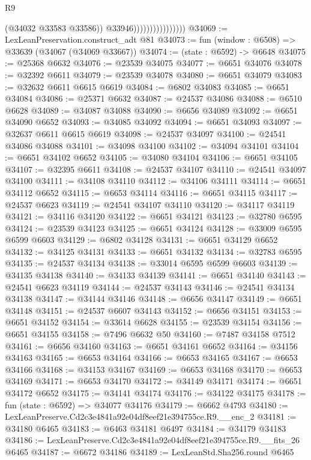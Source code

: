 \begin{lexlean}{R9}
\begin{coremodule}
                                      (@34032 @33583 @33586))
                                    @33946))))))))))))))))
@34069 := LexLeanPreservation.construct_adt @81
@34073 := fun (window : @6508) => @33639 (@34067 (@34069 @33667))
@34074 := (state : @6592) -> @6648
@34075 := @25368 @6632
@34076 := @23539 @34075
@34077 := @6651 @34076
@34078 := @32392 @6611
@34079 := @23539 @34078
@34080 := @6651 @34079
@34083 := @32632 @6611 @6615 @6619
@34084 := @6802 @34083
@34085 := @6651 @34084
@34086 := @25371 @6632
@34087 := @24537 @34086
@34088 := @6510 @6628
@34089 := @34087 @34088
@34090 := @6656 @34089
@34092 := @6651 @34090 @6652
@34093 := @34085 @34092
@34094 := @6651 @34093
@34097 := @32637 @6611 @6615 @6619
@34098 := @24537 @34097
@34100 := @24541 @34086 @34088
@34101 := @34098 @34100
@34102 := @34094 @34101
@34104 := @6651 @34102 @6652
@34105 := @34080 @34104
@34106 := @6651 @34105
@34107 := @32395 @6611
@34108 := @24537 @34107
@34110 := @24541 @34097 @34100
@34111 := @34108 @34110
@34112 := @34106 @34111
@34114 := @6651 @34112 @6652
@34115 := @6653 @34114
@34116 := @6651 @34115
@34117 := @24537 @6623
@34119 := @24541 @34107 @34110
@34120 := @34117 @34119
@34121 := @34116 @34120
@34122 := @6651 @34121
@34123 := @32780 @6595
@34124 := @23539 @34123
@34125 := @6651 @34124
@34128 := @33009 @6595 @6599 @6603
@34129 := @6802 @34128
@34131 := @6651 @34129 @6652
@34132 := @34125 @34131
@34133 := @6651 @34132
@34134 := @32783 @6595
@34135 := @24537 @34134
@34138 := @33014 @6595 @6599 @6603
@34139 := @34135 @34138
@34140 := @34133 @34139
@34141 := @6651 @34140
@34143 := @24541 @6623 @34119
@34144 := @24537 @34143
@34146 := @24541 @34134 @34138
@34147 := @34144 @34146
@34148 := @6656 @34147
@34149 := @6651 @34148
@34151 := @24537 @6607 @34143
@34152 := @6656 @34151
@34153 := @6651 @34152
@34154 := @33614 @6628
@34155 := @23539 @34154
@34156 := @6651 @34155
@34158 := @7496 @6632 @50
@34160 := @7487 @34158 @7512
@34161 := @6656 @34160
@34163 := @6651 @34161 @6652
@34164 := @34156 @34163
@34165 := @6653 @34164
@34166 := @6653 @34165
@34167 := @6653 @34166
@34168 := @34153 @34167
@34169 := @6653 @34168
@34170 := @6653 @34169
@34171 := @6653 @34170
@34172 := @34149 @34171
@34174 := @6651 @34172 @6652
@34175 := @34141 @34174
@34176 := @34122 @34175
@34178 := fun (state : @6592) => @34077 @34176
@34179 := @6662 @4793
@34180 := LexLeanPreserve.Cd2c3e4841a92e04df8eef21e394755ce.R9.__enc_2
@34181 := @34180 @6465
@34183 := @6463 @34181 @6497
@34184 := @34179 @34183
@34186 := LexLeanPreserve.Cd2c3e4841a92e04df8eef21e394755ce.R9.__fits_26 @6465
@34187 := @6672 @34186
@34189 := LexLeanStd.Sha256.round @6465

\end{coremodule}
\end{lexlean}
